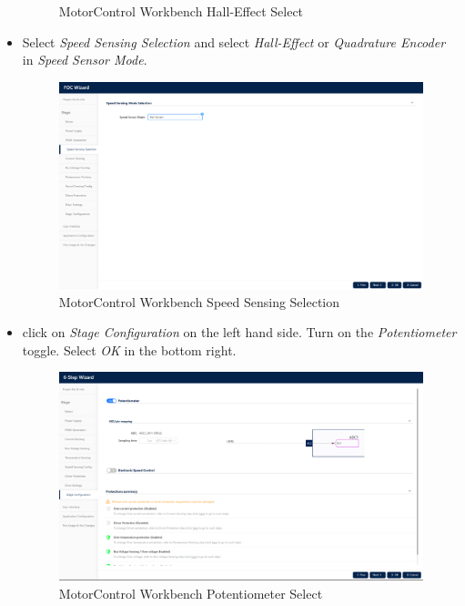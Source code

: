 \documentclass[10pt]{article}
\begin{document}
\begin{itemize}
\begin{figure}[H]
                        \caption{MotorControl Workbench Hall-Effect Select}
                    \end{figure}
                \item Select \emph{Speed Sensing Selection} and select \emph{Hall-Effect} or \emph{Quadrature Encoder} in \emph{Speed Sensor Mode}.
                    \begin{figure}[H]
                        \centerline{\includegraphics[width=\textwidth]{References/MCW FOC Speed Sensing Selection.png}}
                        \caption{MotorControl Workbench Speed Sensing Selection}
                    \end{figure}
                \item click on \emph{Stage Configuration} on the left hand side. Turn on the \emph{Potentiometer} toggle. Select \emph{OK} in the bottom right.
                    \begin{figure}[H]
                        \centerline{\includegraphics[width=\textwidth]{References/MCW 6-step Potentiometer.png}}
                        \caption{MotorControl Workbench Potentiometer Select}

\end{figure}
\end{itemize}
\end{document}
